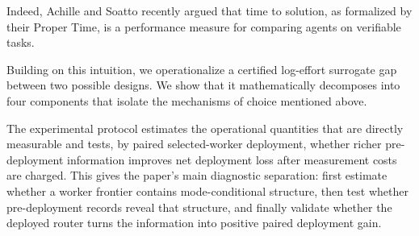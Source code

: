 \documentclass{article}
\begin{document}
Indeed, Achille and Soatto \citep{achille2025agents} recently argued that time to solution, as formalized by their Proper Time, is a performance measure for comparing agents on verifiable tasks.

Building on this intuition, we operationalize a certified log-effort surrogate gap between two possible designs. We show that it mathematically decomposes into four components that isolate the mechanisms of choice mentioned above.

The experimental protocol estimates the operational quantities that are directly measurable and tests, by paired selected-worker deployment, whether richer pre-deployment information improves net deployment loss after measurement costs are charged.
This gives the paper's main diagnostic separation: first estimate whether a worker frontier contains mode-conditional structure, then test whether pre-deployment records reveal that structure, and finally validate whether the deployed router turns the information into positive paired deployment gain.



\end{document}
